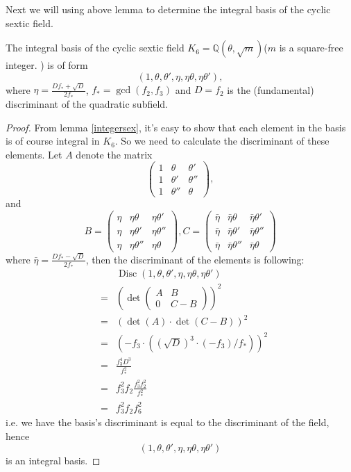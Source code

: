 Next we will using above lemma to determine the integral basis of the cyclic sextic field. 
\begin{theorem}\label{thm:intbasis_sex}
The integral basis of the cyclic sextic field $K_6=\mathbb{Q}(\theta,\sqrt{m})$($m$ is a square-free integer. ) is of form $$(1,\theta,\theta',\eta,\eta\theta,\eta\theta'),$$ where $\eta=\frac{Df_*+\sqrt{D}}{2f_*}$, $f_*=\operatorname{gcd}(f_2,f_3)$ and $D=f_2$ is the (fundamental) discriminant of the quadratic subfield.
\begin{proof}
From lemma \ref{integersex}, it's easy to show that each element in the basis is of course integral in $K_6$. So we need to calculate the discriminant of these elements. Let $A$ denote the matrix $$\left(\begin{array}{lll} 1&\theta&\theta'\\ 1&\theta'&\theta'' \\1&\theta''&\theta\end{array}\right),$$
and $$B=\left(\begin{array}{lll} \eta&\eta\theta&\eta\theta'\\ \eta&\eta\theta'&\eta\theta'' \\ \eta&\eta\theta''&\eta\theta\end{array}\right),C=\left(\begin{array}{lll} \bar{\eta}&\bar{\eta}\theta&\bar{\eta}\theta'\\ \bar{\eta}&\bar{\eta}\theta'&\bar{\eta}\theta'' \\ \bar{\eta}&\bar{\eta}\theta''&\bar{\eta}\theta\end{array}\right)$$
where $\bar{\eta}=\frac{Df_*-\sqrt{D}}{2f_*}$, then the discriminant of the elements is following:
\begin{eqnarray*}
&&\operatorname{Disc}(1,\theta,\theta',\eta,\eta\theta,\eta\theta')\\
&=&\left(\det\left(\begin{array}{ll} A & B \\ 0&C-B \end{array}\right)\right)^2\\
&=&(\det{(A)}\cdot\det{(C-B)})^2\\
&=&\left(-f_3\cdot((\sqrt{D})^3\cdot(-f_3)/f_*)\right)^2\\
&=&\frac{f_3^4D^3}{f_*^2}\\
&=&f_3^2f_2\frac{f_3^2f_2^2}{f_*^2}\\
&=&f_3^2f_2f_6^2
\end{eqnarray*}
i.e. we have the basis's discriminant is equal to the discriminant of the field, hence $$(1,\theta,\theta',\eta,\eta\theta,\eta\theta')$$ is an integral basis.
\end{proof}
\end{theorem}

